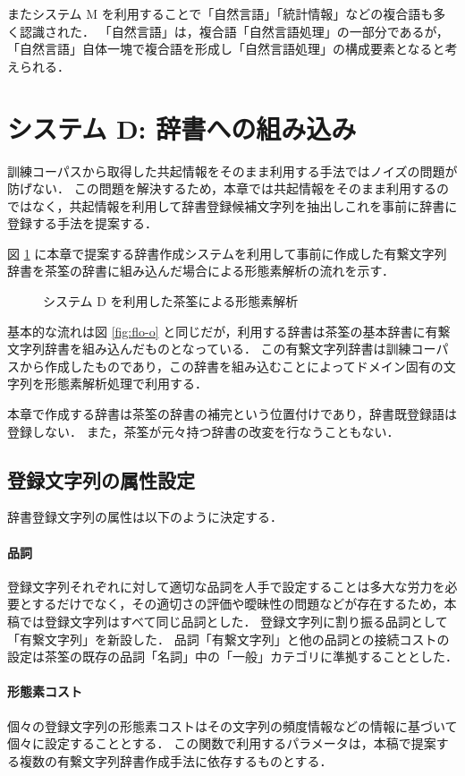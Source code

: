 またシステム M を利用することで「自然言語」「統計情報」などの複合語も多く認識された．
「自然言語」は，複合語「自然言語処理」の一部分であるが，「自然言語」自体一塊で複合語を形成し「自然言語処理」の構成要素となると考えられる．
\section{システム D: 辞書への組み込み}
訓練コーパスから取得した共起情報をそのまま利用する手法ではノイズの問題が防げない．
この問題を解決するため，本章では共起情報をそのまま利用するのではなく，共起情報を利用して辞書登録候補文字列を抽出しこれを事前に辞書に登録する手法を提案する．

図 \ref{fig:flo-d} に本章で提案する辞書作成システムを利用して事前に作成した有繋文字列辞書を茶筌の辞書に組み込んだ場合による形態素解析の流れを示す．
\begin{figure}[hbt]
\begin{center}
\caption{システム D を利用した茶筌による形態素解析}
\label{fig:flo-d}
\end{center}
\end{figure}
基本的な流れは図 \ref{fig:flo-o} と同じだが，利用する辞書は茶筌の基本辞書に有繋文字列辞書を組み込んだものとなっている．
この有繋文字列辞書は訓練コーパスから作成したものであり，この辞書を組み込むことによってドメイン固有の文字列を形態素解析処理で利用する．

本章で作成する辞書は茶筌の辞書の補完という位置付けであり，辞書既登録語は登録しない．
また，茶筌が元々持つ辞書の改変を行なうこともない．
\subsection{登録文字列の属性設定}
\label{sec:morphcost}
辞書登録文字列の属性は以下のように決定する．
\paragraph{品詞}
登録文字列それぞれに対して適切な品詞を人手で設定することは多大な労力を必要とするだけでなく，その適切さの評価や曖昧性の問題などが存在するため，本稿では登録文字列はすべて同じ品詞とした．
登録文字列に割り振る品詞として「有繋文字列」を新設した．
品詞「有繋文字列」と他の品詞との接続コストの設定は茶筌の既存の品詞「名詞」中の「一般」カテゴリに準拠することとした．
\paragraph{形態素コスト}
個々の登録文字列の形態素コストはその文字列の頻度情報などの情報に基づいて個々に設定することとする．
この関数で利用するパラメータは，本稿で提案する複数の有繋文字列辞書作成手法に依存するものとする．


